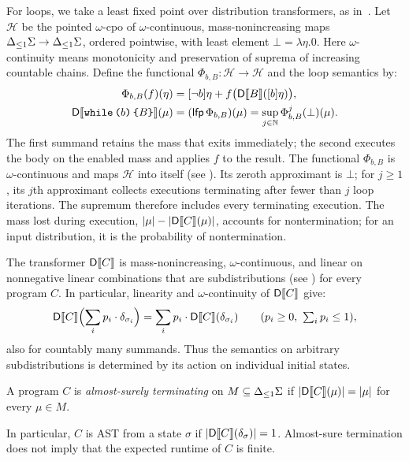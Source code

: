 For loops, we take a least fixed point over distribution transformers,
as in~\cite{zilken2026verifyingsamplingalgorithmsdistributional}.
Let $\mathcal H$ be the pointed $\omega$-cpo of $\omega$-continuous,
mass-nonincreasing maps ${\Delta_{\leq 1} \Sigma}\to{\Delta_{\leq 1}\Sigma}$, ordered pointwise,
with least element $\bot=\lambda\eta.0$.
Here $\omega$-continuity means monotonicity and preservation of suprema
of increasing countable chains. Define the functional
$\Phi_{b,B}:\mathcal H\to\mathcal H$ and the loop semantics by:
\begin{equation}
 \begin{aligned}
 \Phi_{b,B}(f)(\eta)&=[\neg b]\eta+f\bigl(\mathsf{D}\llbracket B\rrbracket([b]\eta)\bigr),\\
 \mathsf{D}\llbracket \textnormal{\texttt{while}}\,\textnormal{\texttt{(}} b\textnormal{\texttt{)}}\,\textnormal{\texttt{\{}} B\textnormal{\texttt{\}}}\rrbracket(\mu)
   &=(\mathsf{lfp\,}\Phi_{b,B})(\mu)
     =\sup_{j\in\mathbb N}\Phi_{b,B}^j(\bot)(\mu).
 \end{aligned}
 \label{eq:while-transformer-fixpoint}
\end{equation}
The first summand retains the mass that exits immediately; the second
executes the body on the enabled mass and applies $f$ to the result.
The functional $\Phi_{b,B}$ is $\omega$-continuous and maps
$\mathcal H$ into itself (see ).
Its zeroth approximant is $\bot$; for $j\geq1$, its $j$th approximant
collects executions terminating after fewer than $j$ loop iterations.
The supremum therefore includes every terminating execution.
The mass lost during execution,
$|\mu|-|\mathsf{D}\llbracket C\rrbracket(\mu)|$, accounts for nontermination;
for an input distribution, it is the probability of nontermination.

The transformer $\mathsf{D}\llbracket C\rrbracket$ is mass-nonincreasing,
$\omega$-continuous, and linear on nonnegative linear combinations that are subdistributions (see ) for every program $C$. In particular, linearity and
$\omega$-continuity of $\mathsf{D}\llbracket C\rrbracket$ give:
\[
 \mathsf{D}\llbracket C\rrbracket\Bigl(\sum_i p_i \cdot \delta_{\sigma_i}\Bigr)
   =\sum_i p_i \cdot \mathsf{D}\llbracket C\rrbracket(\delta_{\sigma_i})
 \qquad(p_i\geq0,\ \textstyle\sum_i p_i\leq1),
\]
also for countably many summands. Thus the semantics on arbitrary
subdistributions is determined by its action on individual initial states.

\begin{definition}
A program $C$ is \emph{almost-surely terminating} on
$M\subseteq{\Delta_{\leq 1}\Sigma}$ if
$|\mathsf{D}\llbracket C\rrbracket(\mu)|=|\mu|$ for every $\mu\in M$.
\end{definition}
In particular, $C$ is AST from a state $\sigma$ if
$|\mathsf{D}\llbracket C\rrbracket(\delta_{\sigma})|=1$.
Almost-sure termination does not imply that the expected runtime of $C$
is finite.

